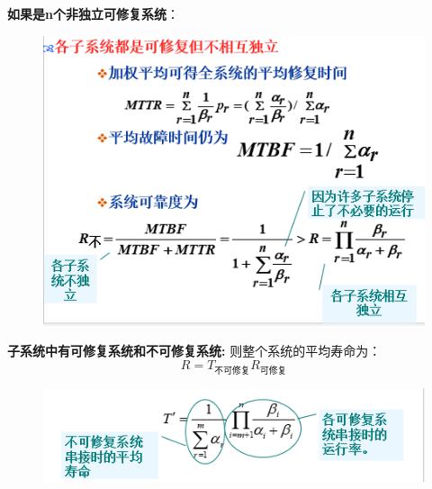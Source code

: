 \textbf{如果是n个非独立可修复系统}：
\begin{figure}[H]
	\centering
	\includegraphics[width=0.7\linewidth]{figures/screenshot093}
	\caption{}
	\label{fig:screenshot093}
\end{figure}
\textbf{子系统中有可修复系统和不可修复系统:}
则整个系统的平均寿命为：
\begin{equation}\label{key}
R=T_{\text{不可修复}}R_{\text{可修复}}
\end{equation}
\begin{figure}[H]
	\centering
	\includegraphics[width=0.7\linewidth]{figures/screenshot094}
	\caption{}
	\label{fig:screenshot094}
\end{figure}
